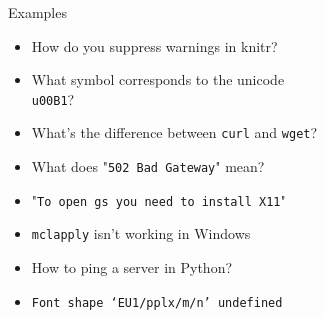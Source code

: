 \documentclass[12pt,t]{beamer}
\newcommand{\bi}{\begin{itemize}}
\newcommand{\ei}{\end{itemize}}
\begin{document}
\begin{frame}{Examples}

\vspace{24pt}

\bi
\item How do you suppress warnings in knitr?
\item What symbol corresponds to the unicode {\tt \\u00B1}?
\item What's the difference between {\tt curl} and {\tt wget}?
\item What does "{\tt 502 Bad Gateway}" mean?
\item "{\tt To open gs you need to install X11}"
\item {\tt mclapply} isn't working in Windows
\item How to ping a server in Python?
\item {\tt Font shape `EU1/pplx/m/n' undefined}
\ei

\end{frame}
\end{document}
